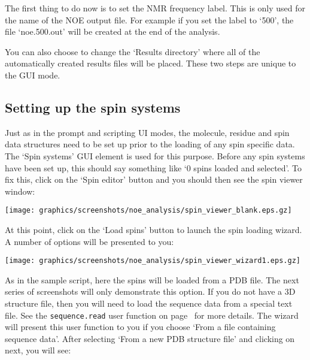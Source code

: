 The first thing to do now is to set the NMR frequency label.  This is only used for the name of the NOE output file.  For example if you set the label to `500', the file `noe.500.out' will be created at the end of the analysis.

You can also choose to change the `Results directory' where all of the automatically created results files will be placed.  These two steps are unique to the GUI mode.



\subsection{Setting up the spin systems}

Just as in the prompt and scripting UI modes, the molecule, residue and spin data structures need to be set up prior to the loading of any spin specific data.  The `Spin systems' GUI element is used for this purpose.  Before any spin systems have been set up, this should say something like `0 spins loaded and selected'.  To fix this, click on the `Spin editor' button and you should then see the spin viewer window:

\begin{minipage}[h]{\linewidth}
\centerline{\texttt{[image: graphics/screenshots/noe\_analysis/spin\_viewer\_blank.eps.gz]}}
\end{minipage}

At this point, click on the `Load spins' button to launch the spin loading wizard.  A number of options will be presented to you: 

\begin{minipage}[h]{\linewidth}
\centerline{\texttt{[image: graphics/screenshots/noe\_analysis/spin\_viewer\_wizard1.eps.gz]}}
\end{minipage}

As in the sample script, here the spins will be loaded from a PDB file.  The next series of screenshots will only demonstrate this option.  If you do not have a 3D structure file, then you will need to load the sequence data from a special text file.  See the \texttt{sequence.read} user function on page~\pageref{uf: sequence.read} for more details.  The wizard will present this user function to you if you choose `From a file containing sequence data'.  After selecting `From a new PDB structure file' and clicking on next, you will see:

